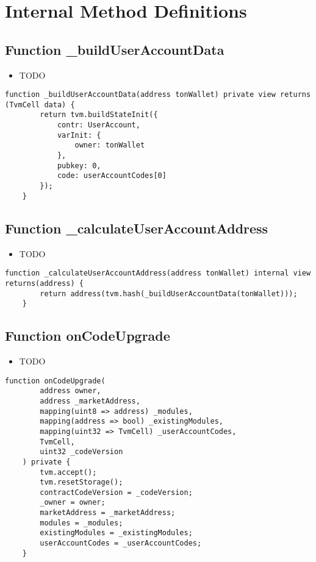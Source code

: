 \section{Internal Method Definitions}


\subsection{Function \_{}buildUserAccountData}

\noindent\begin{itemize}
\item TODO
\end{itemize}

\begin{lstlisting}[firstnumber=137]
    function _buildUserAccountData(address tonWallet) private view returns (TvmCell data) {
        return tvm.buildStateInit({
            contr: UserAccount,
            varInit: {
                owner: tonWallet
            },
            pubkey: 0,
            code: userAccountCodes[0]
        });
    }
\end{lstlisting}

\subsection{Function \_{}calculateUserAccountAddress}

\noindent\begin{itemize}
\item TODO
\end{itemize}

\begin{lstlisting}[firstnumber=130]
    function _calculateUserAccountAddress(address tonWallet) internal view returns(address) {
        return address(tvm.hash(_buildUserAccountData(tonWallet)));
    }
\end{lstlisting}

\subsection{Function onCodeUpgrade}

\noindent\begin{itemize}
\item TODO
\end{itemize}

\begin{lstlisting}[firstnumber=73]
    function onCodeUpgrade(
        address owner,
        address _marketAddress,
        mapping(uint8 => address) _modules,
        mapping(address => bool) _existingModules,
        mapping(uint32 => TvmCell) _userAccountCodes,
        TvmCell,
        uint32 _codeVersion
    ) private {
        tvm.accept();
        tvm.resetStorage();
        contractCodeVersion = _codeVersion;
        _owner = owner;
        marketAddress = _marketAddress;
        modules = _modules;
        existingModules = _existingModules;
        userAccountCodes = _userAccountCodes;
    }
\end{lstlisting}
